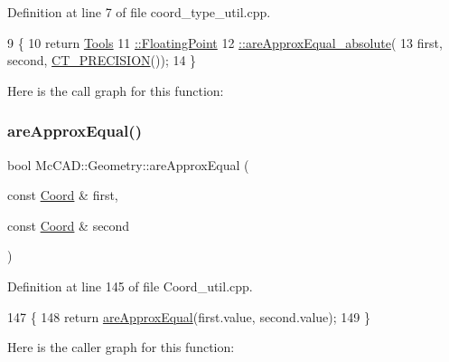 Definition at line 7 of file coord\+\_\+type\+\_\+util.\+cpp.


\begin{DoxyCode}
9                                  \{
10     \textcolor{keywordflow}{return} \hyperlink{namespaceMcCAD_1_1Tools_1_1FloatingPoint_a6c28bdd3911b4023aef2ba97905fca48}{Tools}
11 \hyperlink{namespaceMcCAD_1_1Tools_1_1FloatingPoint_a6c28bdd3911b4023aef2ba97905fca48}{            ::FloatingPoint}
12 \hyperlink{namespaceMcCAD_1_1Tools_1_1FloatingPoint_a6c28bdd3911b4023aef2ba97905fca48}{            ::areApproxEqual\_absolute}(
13                 first, second, \hyperlink{namespaceMcCAD_1_1Geometry_a492f5d9026e8ba8e85f0c81dfb0694ea}{CT\_PRECISION}());
14 \}
\end{DoxyCode}
Here is the call graph for this function\+:
\mbox{\label{namespaceMcCAD_1_1Geometry_acad920c663ce775977ff6dc46b1030af}} 
\subsubsection{\texorpdfstring{are\+Approx\+Equal()}{areApproxEqual()}\hspace{0.1cm}{\footnotesize\ttfamily [2/4]}}
{\footnotesize\ttfamily bool Mc\+C\+A\+D\+::\+Geometry\+::are\+Approx\+Equal (\begin{DoxyParamCaption}\item[{const \hyperlink{classMcCAD_1_1Geometry_1_1Coord}{Coord} \&}]{first,  }\item[{const \hyperlink{classMcCAD_1_1Geometry_1_1Coord}{Coord} \&}]{second }\end{DoxyParamCaption})}



Definition at line 145 of file Coord\+\_\+util.\+cpp.


\begin{DoxyCode}
147                             \{
148     \textcolor{keywordflow}{return} \hyperlink{namespaceMcCAD_1_1Geometry_acad920c663ce775977ff6dc46b1030af}{areApproxEqual}(first.value, second.value);
149 \}
\end{DoxyCode}
Here is the caller graph for this function\+:
\mbox{\label{namespaceMcCAD_1_1Geometry_ae8bd48b3f8822b1bd3c8e9f0d13eeb97}} 
